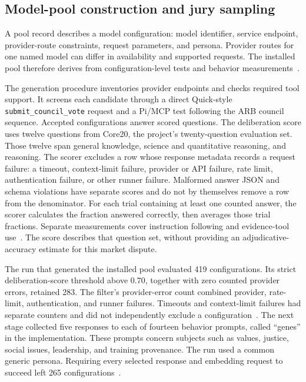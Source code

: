 \documentclass[11pt]{article}
\newcommand{\code}[1]{\texttt{#1}}
\begin{document}
\subsection{Model-pool construction and jury sampling}

A pool record describes a model configuration: model identifier, service endpoint, provider-route constraints, request parameters, and persona.  Provider routes for one named model can differ in availability and supported requests.  The installed pool therefore derives from configuration-level tests and behavior measurements~\cite{poolpaper,poolmanual}.

The generation procedure inventories provider endpoints and checks required tool support.  It screens each candidate through a direct Quick-style \code{submit\_council\_vote} request and a Pi/MCP test following the ARB council sequence.  Accepted configurations answer scored questions.  The deliberation score uses twelve questions from Core20, the project's twenty-question evaluation set.  Those twelve span general knowledge, science and quantitative reasoning, and reasoning.  The scorer excludes a row whose response metadata records a request failure: a timeout, context-limit failure, provider or API failure, rate limit, authentication failure, or other runner failure.  Malformed answer JSON and schema violations have separate scores and do not by themselves remove a row from the denominator.  For each trial containing at least one counted answer, the scorer calculates the fraction answered correctly, then averages those trial fractions.  Separate measurements cover instruction following and evidence-tool use~\cite{poolcode}.  The score describes that question set, without providing an adjudicative-accuracy estimate for this market dispute.

The run that generated the installed pool evaluated 419 configurations.  Its strict deliberation-score threshold above 0.70, together with zero counted provider errors, retained 283.  The filter's provider-error count combined provider, rate-limit, authentication, and runner failures.  Timeouts and context-limit failures had separate counters and did not independently exclude a configuration~\cite{poolcode}.  The next stage collected five responses to each of fourteen behavior prompts, called ``genes'' in the implementation.  These prompts concern subjects such as values, justice, social issues, leadership, and training provenance.  The run used a common generic persona.  Requiring every selected response and embedding request to succeed left 265 configurations~\cite{poolpaper}.
\end{document}
